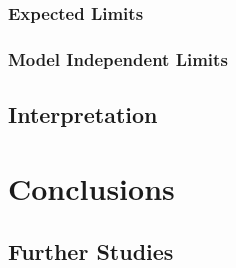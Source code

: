 \documentclass[10pt,twoside,cucitura,classica,english,openany]{toptesi}
\begin{document}


\subsection{Expected Limits}
\label{sec:expected-limits}



\subsection{Model Independent Limits}
\label{sec:model-indep-limits}



\section{Interpretation}
\label{sec:interpretation}



\chapter{Conclusions}
\label{cha:conclusions}



\begin{appendices}
  \chapter{Further Studies}

\end{appendices}

\printglossaries

 \printbibliography
\end{document}
